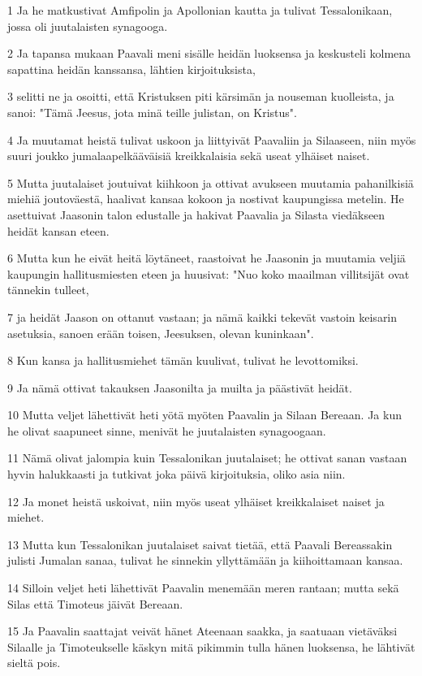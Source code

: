 \par 1 Ja he matkustivat Amfipolin ja Apollonian kautta ja tulivat Tessalonikaan, jossa oli juutalaisten synagooga.
\par 2 Ja tapansa mukaan Paavali meni sisälle heidän luoksensa ja keskusteli kolmena sapattina heidän kanssansa, lähtien kirjoituksista,
\par 3 selitti ne ja osoitti, että Kristuksen piti kärsimän ja nouseman kuolleista, ja sanoi: "Tämä Jeesus, jota minä teille julistan, on Kristus".
\par 4 Ja muutamat heistä tulivat uskoon ja liittyivät Paavaliin ja Silaaseen, niin myös suuri joukko jumalaapelkääväisiä kreikkalaisia sekä useat ylhäiset naiset.
\par 5 Mutta juutalaiset joutuivat kiihkoon ja ottivat avukseen muutamia pahanilkisiä miehiä joutoväestä, haalivat kansaa kokoon ja nostivat kaupungissa metelin. He asettuivat Jaasonin talon edustalle ja hakivat Paavalia ja Silasta viedäkseen heidät kansan eteen.
\par 6 Mutta kun he eivät heitä löytäneet, raastoivat he Jaasonin ja muutamia veljiä kaupungin hallitusmiesten eteen ja huusivat: "Nuo koko maailman villitsijät ovat tännekin tulleet,
\par 7 ja heidät Jaason on ottanut vastaan; ja nämä kaikki tekevät vastoin keisarin asetuksia, sanoen erään toisen, Jeesuksen, olevan kuninkaan".
\par 8 Kun kansa ja hallitusmiehet tämän kuulivat, tulivat he levottomiksi.
\par 9 Ja nämä ottivat takauksen Jaasonilta ja muilta ja päästivät heidät.
\par 10 Mutta veljet lähettivät heti yötä myöten Paavalin ja Silaan Bereaan. Ja kun he olivat saapuneet sinne, menivät he juutalaisten synagoogaan.
\par 11 Nämä olivat jalompia kuin Tessalonikan juutalaiset; he ottivat sanan vastaan hyvin halukkaasti ja tutkivat joka päivä kirjoituksia, oliko asia niin.
\par 12 Ja monet heistä uskoivat, niin myös useat ylhäiset kreikkalaiset naiset ja miehet.
\par 13 Mutta kun Tessalonikan juutalaiset saivat tietää, että Paavali Bereassakin julisti Jumalan sanaa, tulivat he sinnekin yllyttämään ja kiihoittamaan kansaa.
\par 14 Silloin veljet heti lähettivät Paavalin menemään meren rantaan; mutta sekä Silas että Timoteus jäivät Bereaan.
\par 15 Ja Paavalin saattajat veivät hänet Ateenaan saakka, ja saatuaan vietäväksi Silaalle ja Timoteukselle käskyn mitä pikimmin tulla hänen luoksensa, he lähtivät sieltä pois.
